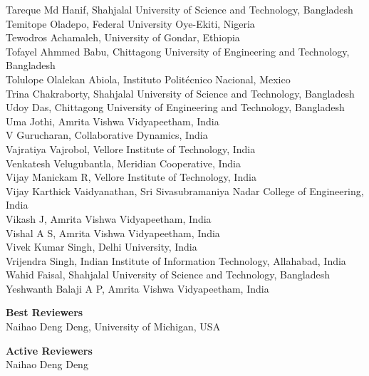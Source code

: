 \documentclass[11pt,oneside]{book}
\begin{document}
\begin{description}
          Tareque Md Hanif, Shahjalal University of Science and Technology, Bangladesh\\
          Temitope Oladepo, Federal University Oye-Ekiti, Nigeria\\
          Tewodros Achamaleh, University of Gondar, Ethiopia\\
          Tofayel Ahmmed Babu, Chittagong University of Engineering and Technology, Bangladesh\\
          Tolulope Olalekan Abiola, Instituto Politécnico Nacional, Mexico\\
          Trina Chakraborty, Shahjalal University of Science and Technology, Bangladesh\\
          Udoy Das, Chittagong University of Engineering and Technology, Bangladesh\\
          Uma Jothi, Amrita Vishwa Vidyapeetham, India\\
          V Gurucharan, Collaborative Dynamics, India\\
          Vajratiya Vajrobol, Vellore Institute of Technology, India\\
          Venkatesh Velugubantla, Meridian Cooperative, India\\
          Vijay Manickam R, Vellore Institute of Technology, India\\
          Vijay Karthick Vaidyanathan, Sri Sivasubramaniya Nadar College of Engineering, India\\
          Vikash J, Amrita Vishwa Vidyapeetham, India\\
          Vishal A S, Amrita Vishwa Vidyapeetham, India\\
          Vivek Kumar Singh, Delhi University, India\\
          Vrijendra Singh, Indian Institute of Information Technology, Allahabad, India\\
          Wahid Faisal, Shahjalal University of Science and Technology, Bangladesh\\
          Yeshwanth Balaji A P, Amrita Vishwa Vidyapeetham, India\\
      
  \item{\bf Best Reviewers}\vspace{2mm}\\
            Naihao Deng Deng, University of Michigan, USA\\
      
  \item{\bf Active Reviewers}\vspace{2mm}\\
                    Naihao Deng Deng\\
        \newline
\end{description}
\newpage
\end{document}
